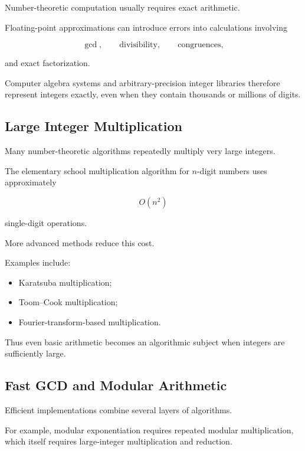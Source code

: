 Number-theoretic computation usually requires exact arithmetic.

Floating-point approximations can introduce errors into calculations involving

\[ \gcd,\qquad\text{divisibility},\qquad\text{congruences}, \]

and exact factorization.

Computer algebra systems and arbitrary-precision integer libraries therefore
represent integers exactly, even when they contain thousands or millions of
digits.

\subsection{Large Integer Multiplication}
\label{subsec:large-integer-multiplication}

Many number-theoretic algorithms repeatedly multiply very large integers.

The elementary school multiplication algorithm for \(n\)-digit numbers uses
approximately

\[ O(n^2) \]

single-digit operations.

More advanced methods reduce this cost.

Examples include:

\begin{itemize}
    \item Karatsuba multiplication;
    \item Toom--Cook multiplication;
    \item Fourier-transform-based multiplication.
\end{itemize}

Thus even basic arithmetic becomes an algorithmic subject when integers are
sufficiently large.

\subsection{Fast GCD and Modular Arithmetic}
\label{subsec:fast-gcd-modular}

Efficient implementations combine several layers of algorithms.

For example, modular exponentiation requires repeated modular multiplication,
which itself requires large-integer multiplication and reduction.

